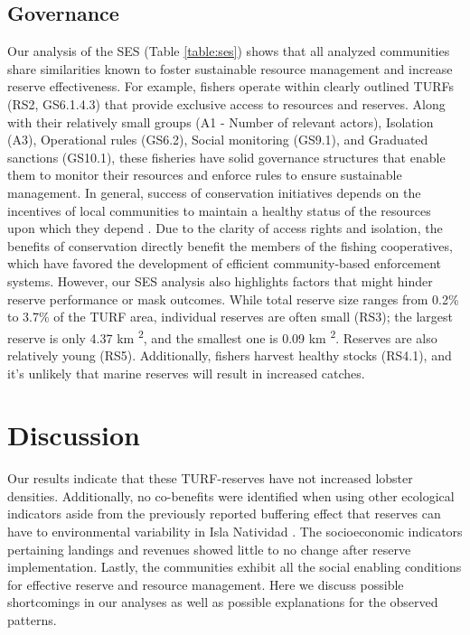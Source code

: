 \documentclass{frontiersSCNS}
\begin{document}
\hypertarget{governance}{%
\subsection{Governance}\label{governance}}

Our analysis of the SES (Table \ref{table:ses}) shows that all analyzed
communities share similarities known to foster sustainable resource
management and increase reserve effectiveness. For example, fishers
operate within clearly outlined TURFs (RS2, GS6.1.4.3) that provide
exclusive access to resources and reserves. Along with their relatively
small groups (A1 - Number of relevant actors), Isolation (A3),
Operational rules (GS6.2), Social monitoring (GS9.1), and Graduated
sanctions (GS10.1), these fisheries have solid governance structures
that enable them to monitor their resources and enforce rules to ensure
sustainable management. In general, success of conservation initiatives
depends on the incentives of local communities to maintain a healthy
status of the resources upon which they depend \citep{jupiter_2017}. Due
to the clarity of access rights and isolation, the benefits of
conservation directly benefit the members of the fishing cooperatives,
which have favored the development of efficient community-based
enforcement systems. However, our SES analysis also highlights factors
that might hinder reserve performance or mask outcomes. While total
reserve size ranges from 0.2\% to 3.7\% of the TURF area, individual
reserves are often small (RS3); the largest reserve is only 4.37 km
\textsuperscript{2}, and the smallest one is 0.09 km
\textsuperscript{2}. Reserves are also relatively young (RS5).
Additionally, fishers harvest healthy stocks (RS4.1), and it's unlikely
that marine reserves will result in increased catches.

\hypertarget{discussion}{%
\section{Discussion}\label{discussion}}

Our results indicate that these TURF-reserves have not increased lobster
densities. Additionally, no co-benefits were identified when using other
ecological indicators aside from the previously reported buffering
effect that reserves can have to environmental variability in Isla
Natividad \citep{micheli_2012-EU}. The socioeconomic indicators
pertaining landings and revenues showed little to no change after
reserve implementation. Lastly, the communities exhibit all the social
enabling conditions for effective reserve and resource management. Here
we discuss possible shortcomings in our analyses as well as possible
explanations for the observed patterns.
\end{document}
